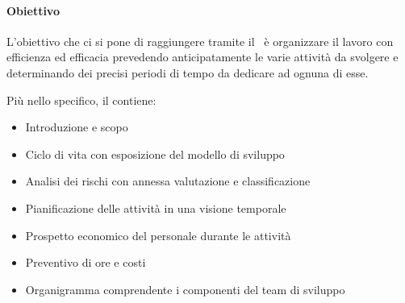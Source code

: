 			\paragraph{Obiettivo}
			L'obiettivo che ci si pone di raggiungere tramite il \PdP\ è organizzare il lavoro con efficienza ed efficacia prevedendo anticipatamente le varie attività da svolgere e determinando dei precisi periodi di tempo da dedicare ad ognuna di esse. \par
			Più nello specifico, il \Doc{\PdPv} contiene:
			\begin{itemize}
				\item Introduzione e scopo
				\item Ciclo di vita con esposizione del modello di sviluppo
				\item Analisi dei rischi con annessa valutazione e classificazione
				\item Pianificazione delle attività in una visione temporale
				\item Prospetto economico del personale durante le attività
				\item Preventivo di ore e costi
				\item Organigramma comprendente i componenti del team di sviluppo
			\end{itemize}

